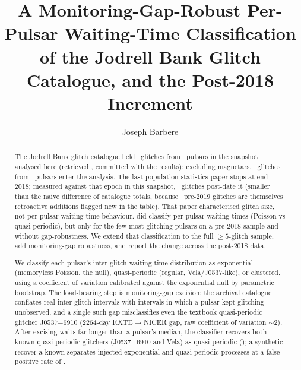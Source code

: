 \documentclass[twocolumn]{aastex631}
\begin{document}
\title{A Monitoring-Gap-Robust Per-Pulsar Waiting-Time Classification of the Jodrell Bank
Glitch Catalogue, and the Post-2018 Increment}
\author[0009-0008-3289-4447]{Joseph Barbere}

\begin{abstract}
The Jodrell Bank glitch catalogue \citep{espinoza2011,basu2022,jbocat} held
\gpRealNGlitchesRaw\ glitches from \gpRealNPulsarsRaw\ pulsars in the snapshot analysed here
(retrieved \gpRealRetrieved, committed with the results); excluding magnetars,
\gpRealNGlitches\ glitches from \gpRealNPulsars\ pulsars enter the analysis. The last population-statistics paper
\citep{basu2022} stops at end-2018; measured against that epoch in this snapshot,
\gpRealNPostSplit\ glitches post-date it (smaller than the naive difference of catalogue
totals, because \gpRealNRetroPre\ pre-2019 glitches are themselves retroactive additions
flagged new in the table). That paper characterised glitch size, not
per-pulsar waiting-time behaviour.
\citet{howitt2018} did classify per-pulsar waiting times (Poisson vs quasi-periodic), but only
for the few most-glitching pulsars on a pre-2018 sample and without gap-robustness. We extend that classification to
the full $\ge5$-glitch sample, add monitoring-gap robustness, and report the change
across the post-2018 data.

We classify each pulsar's inter-glitch waiting-time distribution as exponential (memoryless
Poisson, the null), quasi-periodic (regular, Vela/J0537-like), or clustered, using a
coefficient of variation calibrated against the exponential null by parametric bootstrap. The
load-bearing step is monitoring-gap excision: the archival
catalogue conflates real inter-glitch intervals with intervals in which a pulsar kept glitching
unobserved, and a single such gap misclassifies even the textbook quasi-periodic glitcher
J0537$-$6910 (2264-day RXTE$\to$NICER gap, raw coefficient of variation $\sim$2). After excising
waits far longer than a pulsar's median, the classifier recovers both known
quasi-periodic glitchers (J0537$-$6910 and Vela) as quasi-periodic (\gpRealKnownQpOK); a
synthetic recover-a-known separates injected exponential and quasi-periodic processes at a
false-positive rate of \gpSynFP.


\end{abstract}
\end{document}
